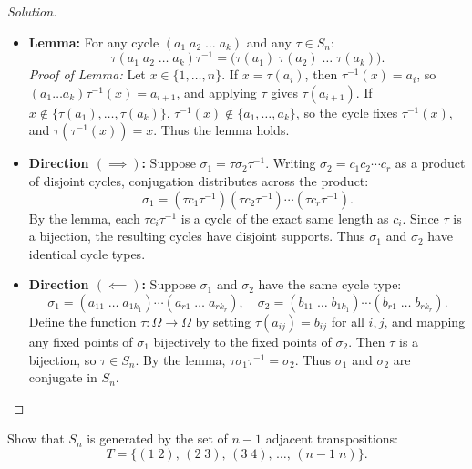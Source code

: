 \begin{proof}[Solution]
\begin{itemize}[leftmargin=1.5em, itemsep=6pt]
    \item \textbf{Lemma:} For any cycle $(a_1 \; a_2 \; \dots \; a_k)$ and any $\tau \in S_n$:
    \begin{equation*}
    \tau (a_1 \; a_2 \; \dots \; a_k) \tau^{-1} = \bigl(\tau(a_1) \; \tau(a_2) \; \dots \; \tau(a_k)\bigr).
    \end{equation*}
    \emph{Proof of Lemma:} Let $x \in \{1, \dots, n\}$.
    If $x = \tau(a_i)$, then $\tau^{-1}(x) = a_i$, so $(a_1 \dots a_k)\tau^{-1}(x) = a_{i+1}$, and applying $\tau$ gives $\tau(a_{i+1})$.
    If $x \notin \{\tau(a_1), \dots, \tau(a_k)\}$, $\tau^{-1}(x) \notin \{a_1, \dots, a_k\}$, so the cycle fixes $\tau^{-1}(x)$, and $\tau(\tau^{-1}(x)) = x$.
    Thus the lemma holds.

    \item \textbf{Direction $(\implies)$:} Suppose $\sigma_1 = \tau \sigma_2 \tau^{-1}$.
    Writing $\sigma_2 = c_1 c_2 \cdots c_r$ as a product of disjoint cycles, conjugation distributes across the product:
    \begin{equation*}
    \sigma_1 = (\tau c_1 \tau^{-1})(\tau c_2 \tau^{-1})\cdots(\tau c_r \tau^{-1}).
    \end{equation*}
    By the lemma, each $\tau c_i \tau^{-1}$ is a cycle of the exact same length as $c_i$.
    Since $\tau$ is a bijection, the resulting cycles have disjoint supports.
    Thus $\sigma_1$ and $\sigma_2$ have identical cycle types.

    \item \textbf{Direction $(\impliedby)$:} Suppose $\sigma_1$ and $\sigma_2$ have the same cycle type:
    \begin{equation*}
    \sigma_1 = (a_{11} \; \dots \; a_{1k_1})\cdots(a_{r1} \; \dots \; a_{rk_r}), \quad \sigma_2 = (b_{11} \; \dots \; b_{1k_1})\cdots(b_{r1} \; \dots \; b_{rk_r}).
    \end{equation*}
    Define the function $\tau: \Omega \to \Omega$ by setting $\tau(a_{ij}) = b_{ij}$ for all $i, j$, and mapping any fixed points of $\sigma_1$ bijectively to the fixed points of $\sigma_2$.
    Then $\tau$ is a bijection, so $\tau \in S_n$.
    By the lemma, $\tau \sigma_1 \tau^{-1} = \sigma_2$.
    Thus $\sigma_1$ and $\sigma_2$ are conjugate in $S_n$.
\end{itemize}
\end{proof}

\begin{problem}
Show that $S_n$ is generated by the set of $n - 1$ adjacent transpositions:
\begin{equation}
T = \{ (1 \; 2), \, (2 \; 3), \, (3 \; 4), \, \dots, \, (n-1 \; n) \}.
\end{equation}
\end{problem}

